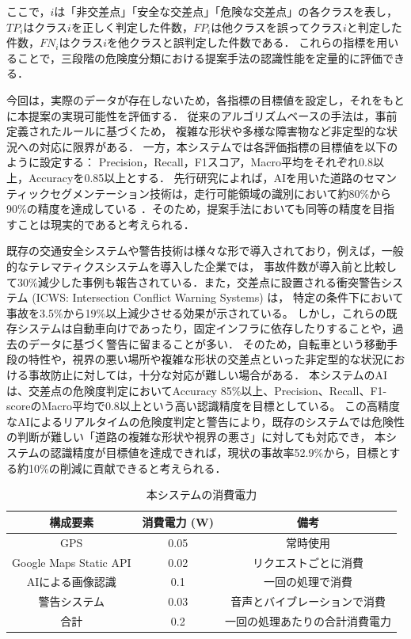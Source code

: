 \documentclass[uplatex,dvipdfmx]{jsarticle}
\begin{document}
\vspace{1cm}

ここで，$i$は「非交差点」「安全な交差点」「危険な交差点」の各クラスを表し，$TP_i$はクラス$i$を正しく判定した件数，$FP_i$は他クラスを誤ってクラス$i$と判定した件数，$FN_i$はクラス$i$を他クラスと誤判定した件数である．
これらの指標を用いることで，三段階の危険度分類における提案手法の認識性能を定量的に評価できる．
\par
今回は，実際のデータが存在しないため，各指標の目標値を設定し，それをもとに本提案の実現可能性を評価する．
従来のアルゴリズムベースの手法は，事前定義されたルールに基づくため，
複雑な形状や多様な障害物など非定型的な状況への対応に限界がある\cite{technolynx_dl_vs_traditional, mdpi_comprehensive_survey_dl_image_processing, peerj_intersection_prediction}．
一方，本システムでは各評価指標の目標値を以下のように設定する：
Precision，Recall，F1スコア，Macro平均をそれぞれ0.8以上，Accuracyを0.85以上とする．
先行研究によれば，AIを用いた道路のセマンティックセグメンテーション技術は，走行可能領域の識別において約80\%から90\%の精度を達成している
\cite{ref:road_segmentation}．そのため，提案手法においても同等の精度を目指すことは現実的であると考えられる．
\par
既存の交通安全システムや警告技術は様々な形で導入されており，例えば，一般的なテレマティクスシステムを導入した企業では，
事故件数が導入前と比較して30\%減少した事例も報告されている\cite{ref:telematics}．また，交差点に設置される衝突警告システム (ICWS: Intersection Conflict Warning Systems) は，
特定の条件下において事故を3.5\%から19\%以上減少させる効果が示されている\cite{ref:fhwa}。
しかし，これらの既存システムは自動車向けであったり，固定インフラに依存したりすることや，過去のデータに基づく警告に留まることが多い．
そのため，自転車という移動手段の特性や，視界の悪い場所や複雑な形状の交差点といった非定型的な状況における事故防止に対しては，十分な対応が難しい場合がある．
本システムのAIは、交差点の危険度判定においてAccuracy 85\%以上、Precision、Recall、F1-scoreのMacro平均で0.8以上という高い認識精度を目標としている。
この高精度なAIによるリアルタイムの危険度判定と警告により，既存のシステムでは危険性の判断が難しい「道路の複雑な形状や視界の悪さ」に対しても対応でき，
本システムの認識精度が目標値を達成できれば，現状の事故率52.9\%から，目標とする約10\%の削減に貢献できると考えられる．
\par
\begin{table}[H]
  \centering
  \caption{本システムの消費電力}
  \label{tab:power_consumption}
  \begin{tabular}{|c|c|c|}
    \hline
    構成要素 & 消費電力 (W) & 備考 \\ \hline
    GPS & 0.05 & 常時使用 \\ \hline
    Google Maps Static API & 0.02 & リクエストごとに消費 \\ \hline
    AIによる画像認識 & 0.1 & 一回の処理で消費 \\ \hline
    警告システム & 0.03 & 音声とバイブレーションで消費 \\ \hline
    合計 & 0.2 & 一回の処理あたりの合計消費電力 \\ \hline
\end{tabular}
\end{table}
\end{document}
